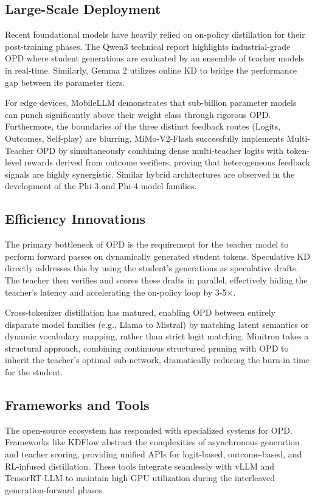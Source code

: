 \documentclass{article}
\begin{document}
\subsection{Large-Scale Deployment}
Recent foundational models have heavily relied on on-policy distillation for their post-training phases. The Qwen3 technical report \citep{arxiv_2505_09388} highlights industrial-grade OPD where student generations are evaluated by an ensemble of teacher models in real-time. Similarly, Gemma 2 \citep{arxiv_2406_06608} utilizes online KD to bridge the performance gap between its parameter tiers. 

For edge devices, MobileLLM \citep{arxiv_2509_24945} demonstrates that sub-billion parameter models can punch significantly above their weight class through rigorous OPD. Furthermore, the boundaries of the three distinct feedback routes (Logits, Outcomes, Self-play) are blurring. MiMo-V2-Flash \citep{arxiv_2601_02780} successfully implements Multi-Teacher OPD by simultaneously combining dense multi-teacher logits with token-level rewards derived from outcome verifiers, proving that heterogeneous feedback signals are highly synergistic. Similar hybrid architectures are observed in the development of the Phi-3 \citep{arxiv_2404_14219} and Phi-4 \citep{arxiv_2503_01743} model families.

\subsection{Efficiency Innovations}
The primary bottleneck of OPD is the requirement for the teacher model to perform forward passes on dynamically generated student tokens. Speculative KD \citep{arxiv_2410_11325, arxiv_2510_24021} directly addresses this by using the student's generations as speculative drafts. The teacher then verifies and scores these drafts in parallel, effectively hiding the teacher's latency and accelerating the on-policy loop by 3-5$\times$.

Cross-tokenizer distillation \citep{arxiv_2402_12030, arxiv_2310_13332} has matured, enabling OPD between entirely disparate model families (e.g., Llama to Mistral) by matching latent semantics or dynamic vocabulary mapping, rather than strict logit matching. Minitron \citep{arxiv_2311_09829} takes a structural approach, combining continuous structured pruning with OPD to inherit the teacher's optimal sub-network, dramatically reducing the burn-in time for the student.

\subsection{Frameworks and Tools}
The open-source ecosystem has responded with specialized systems for OPD. Frameworks like KDFlow \citep{arxiv_2603_01875} abstract the complexities of asynchronous generation and teacher scoring, providing unified APIs for logit-based, outcome-based, and RL-infused distillation. These tools integrate seamlessly with vLLM and TensorRT-LLM to maintain high GPU utilization during the interleaved generation-forward phases.
\end{document}
